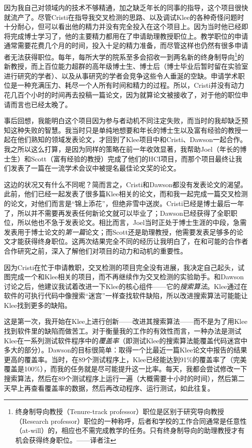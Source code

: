 \documentclass[letter,12pt]{book}
\begin{document}
\begin{CJK}{UTF8}{gbsn}
因为我自己对领域内的技术不够精通，加之缺乏年长的同事的指导，这个项目很快就流产了。尽管Cristi在指导我交叉检测的思路、以及调试Klee的各种奇怪问题时十分耐心，但可以看出他的精力并没有完全投入在这个项目上。因为当时他已经即将完成博士学习了，他的主要精力都用在了申请助理教授职位上。教学职位的申请通常需要花费几个月的时间，投入十足的精力准备，而尽管这样也仍然有很多申请者无法获得职位。每年，每所大学的院系至多会招收一到两名新的终身制导向\footnote{终身制导向教授（Tenure-track professor）职位是区别于研究导向教授（Research professor）职位的一种称呼，后者和学校的工作合同通常是任意性（at-will）的，相应也不需完成教学的任务。只有终身制导向的助理教授才有机会获得终身职位。——译者注}的新教授，而上百位能力超群的高年级博士生、博士后（博士毕业后暂时留在实验室进行研究的学者）、以及从事研究的学者会竞争这些令人垂涎的空缺。申请学术职位是一种充满压力、耗尽一个人所有时间和精力的过程。所以，Cristi并没有动力花几百个小时的时间再去投稿一篇论文，因为就算论文被接收了，对于他的职位申请而言也已经太晚了。

事后回想，我能明白这个项目因为参与者动机不同注定失败，而当时的我却缺乏预知这种失败的智慧。我当时只是单纯地想要和年长的博士生以及富有经验的教授一起在他们熟知的领域发表论文，才回到了Klee项目中和Cristi、Dawson一起合作。我之所以这么打算，是因为同样的策略在前一年收效显著，我帮助Joel（年长的博士生）和Scott（富有经验的教授）完成了他们的HCI项目，而那个项目最终让我们发表了一篇在一流学术会议中被提名最佳论文奖的论文。

这边的状况又有什么不同呢？简而言之，Cristi和Dawson都没有发表论文的渴望。此前，他们已经一起发表了很多篇Klee相关的论文，而和我一起完成一篇交叉检测的论文，对他们而言是“锦上添花”，但绝非雪中送炭。Cristi已经是博士最后一年了，所以并不需要再发表任何新论文就可以毕业了；Dawson已经获得了全职职位，所以他也不急于发表论文。相比而言，Joel当时正处于博士生涯的中段，急需发表用于博士论文的\emph{第一篇}论文；而Scott还是助理教授，他需要发表足够多的论文才能获得终身职位。这两次结果完全不同的经历让我明白了，在和可能的合作者合作研究之前，深入了解他们对项目的动力和动机的重要性。

\breakline

因为Cristi在忙于申请教职，交叉检测的项目完全没有进展，我决定自己起头，试图完成一个和Klee相关的项目，而不再继续作为交叉检测的实验助手。和Dawson讨论之后，他建议我试着改进一下Klee的核心组件——它的\emph{搜索算法}。Klee通过在软件的可执行代码中像搜索“迷宫”一样查找软件缺陷，所以改进搜索算法可能能让Klee找到更多的缺陷。

这是第一次，我开始在Klee上进行创新——改进其搜索算法——而不是为了用Klee找到软件里的缺陷而做苦工。对于衡量我的工作的有效性而言，一种办法是测试Klee在一系列测试软件程序中的\emph{覆盖率}（即测试Klee的搜索算法能覆盖代码迷宫中多大的部分）。Dawson的目标很简单：取得一个比最近一篇Klee论文中报告的结果更高的覆盖率。当时，在89个测试程序上，Klee已经能达到91\%的覆盖率了（完美覆盖是100\%），而我的任务就是尽可能提升这一比率。每天，我都会尝试修改一下搜索算法，然后在89个测试程序上运行一遍（大概需要十小时的时间），然后第二天早上再查看覆盖率的数据，然后再改动程序、运行测试，如此往复。


\end{CJK}
\end{document}
